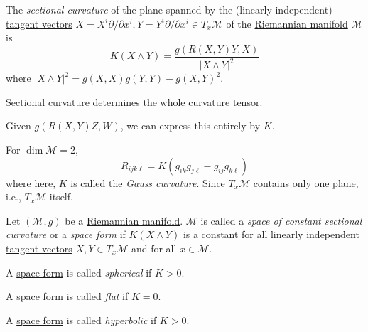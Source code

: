 \begin{definition}\label{def:sectional-curvature}
	The \emph{sectional curvature} of the plane spanned by the (linearly independent) \hyperref[def:tangent-vector]{tangent vectors} \(X = X^i \partial / \partial x^i, Y= Y^i \partial / \partial x^i\in T_x \mathcal{M} \) of the \hyperref[def:Riemannian-manifold]{Riemannian manifold} \(\mathcal{M} \) is
	\[
		K(X \wedge Y) = \frac{g(R(X, Y) Y, X)}{\vert X\wedge Y \vert^2 }
	\]
	where \(\vert X \wedge Y \vert ^2 = g(X, X) g(Y, Y) - g(X, Y)^2\).
\end{definition}

\begin{remark}
	\hyperref[def:sectional-curvature]{Sectional curvature} determines the whole \hyperref[def:Riemannian-curvature]{curvature tensor}.
\end{remark}
\begin{explanation}
	Given \(g(R(X, Y)Z, W)\), we can express this entirely by \(K\).
\end{explanation}

\begin{remark}
	For \(\dim \mathcal{M} = 2\),
	\[
		R_{ijk\ell} = K(g_{ik} g_{j \ell } - g_{ij} g_{k \ell })
	\]
	where here, \(K\) is called the \emph{Gauss curvature}.	Since \(T_x \mathcal{M} \) contains only one plane, i.e., \(T_x \mathcal{M} \) itself.
\end{remark}

\begin{definition}\label{def:space-form}
	Let \((\mathcal{M} , g)\) be a \hyperref[def:Riemannian-manifold]{Riemannian manifold}. \(\mathcal{M} \) is called a \emph{space of constant sectional curvature} or a \emph{space form} if \(K(X\wedge Y) \) is a constant for all linearly independent \hyperref[def:tangent-vector]{tangent vectors} \(X, Y\in T_x \mathcal{M} \) and for all \(x\in \mathcal{M} \).

	\begin{definition}[Spherical]\label{def:space-form-spherical}
		A \hyperref[def:space-form]{space form} is called \emph{spherical} if \(K > 0\).
	\end{definition}

	\begin{definition}[Flat]\label{def:space-form-flat}
		A \hyperref[def:space-form]{space form} is called \emph{flat} if \(K = 0\).
	\end{definition}

	\begin{definition}[Hyperbolic]\label{def:space-form-hyperbolic}
		A \hyperref[def:space-form]{space form} is called \emph{hyperbolic} if \(K > 0\).
	\end{definition}
\end{definition}


